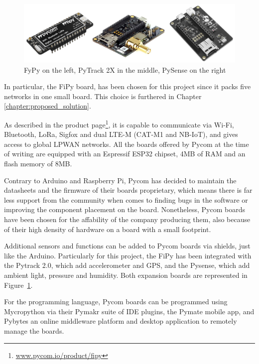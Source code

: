 			\begin{figure}
				\centering
				\includegraphics[width=\textwidth]{resources/img/chap3/pycom_board}
				\caption{FyPy on the left, PyTrack 2X in the middle, PySense on the right}
				\label{img:pycom_board}
			\end{figure}	
			
			In particular, the FiPy board, has been chosen for this project since it packs five networks in one small board.
			This choice is furthered in Chapter \ref{chapter:proposed_solution}.
			
			As described in the product page\footnote{ \url{www.pycom.io/product/fipy}}, it is capable to communicate via Wi-Fi, Bluetooth, LoRa, Sigfox and dual LTE-M (CAT-M1 and NB-IoT), and gives access to global LPWAN networks.
			All the boards offered by Pycom at the time of writing are equipped with an Espressif ESP32 chipset, 4MB of RAM and an flash memory of 8MB.
			
			Contrary to Arduino and Raspberry Pi, Pycom has decided to maintain the datasheets and the firmware of their boards proprietary, which means there is far less support from the community when comes to finding bugs in the software or improving the component placement on the board.
			Nonetheless, Pycom boards have been chosen for the affability of the company producing them, also because of their high density of hardware on a board with a small footprint.
			
			Additional sensors and functions can be added to Pycom boards via shields, just like the Arduino.
			Particularly for this project, the FiPy has been integrated with the Pytrack 2.0, which add accelerometer and GPS, and the Pysense, which add ambient light, pressure and humidity.
			Both expansion boards are represented in Figure~\ref{img:pycom_board}.
					
			For the programming language, Pycom boards can be programmed using Mycropython via their Pymakr suite of IDE plugins, the Pymate mobile app, and Pybytes an online middleware platform and desktop application to remotely manage the boards.
			
